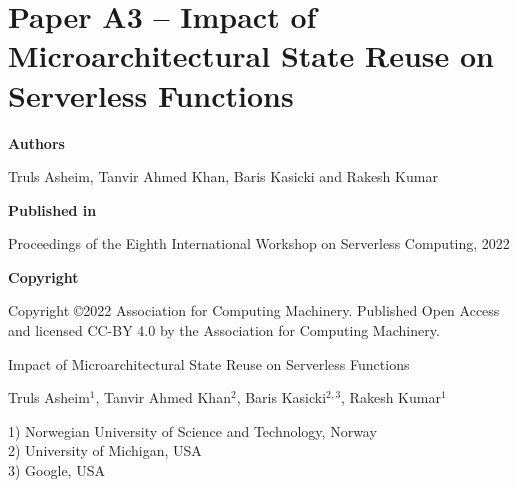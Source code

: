 \documentclass[../../../main.tex]{subfiles}
\begin{document}
{
\chapter[Paper A3 -- Impact of Microarchitectural State Reuse on Serverless Functions][Paper A3 -- Microarchitectural State Reuse in Serverless Functions]{Paper A3 -- Impact of Microarchitectural State Reuse on Serverless Functions}
\label{chap:wosc-paper}

\noindent \textbf{Authors}

\vspace*{0.3cm}

\noindent Truls Asheim, Tanvir Ahmed Khan, Baris Kasicki and Rakesh Kumar

\vspace*{0.7cm}

\noindent \textbf{Published in}

\vspace*{0.3cm}

\noindent Proceedings of the Eighth International Workshop on Serverless Computing, 2022

\vspace*{0.7cm}

\noindent \textbf{Copyright}

\vspace*{0.3cm}

\noindent Copyright ©2022 Association for Computing Machinery. Published Open Access and licensed CC-BY 4.0 by the Association for Computing Machinery.
}
\newpage


\vspace*{0.1cm}

\begin{center}

\Huge{Impact of Microarchitectural State Reuse on Serverless Functions}

\vspace{0.6cm}

\large{Truls Asheim$^{1}$, Tanvir Ahmed Khan$^{2}$, Baris Kasicki$^{2,3}$, Rakesh Kumar$^{1}$}

\vspace{0.1cm}

\small{1) Norwegian University of Science and Technology, Norway}\\
\small{2) University of Michigan, USA}\\
\small{3) Google, USA}\\


\end{center}
\end{document}
